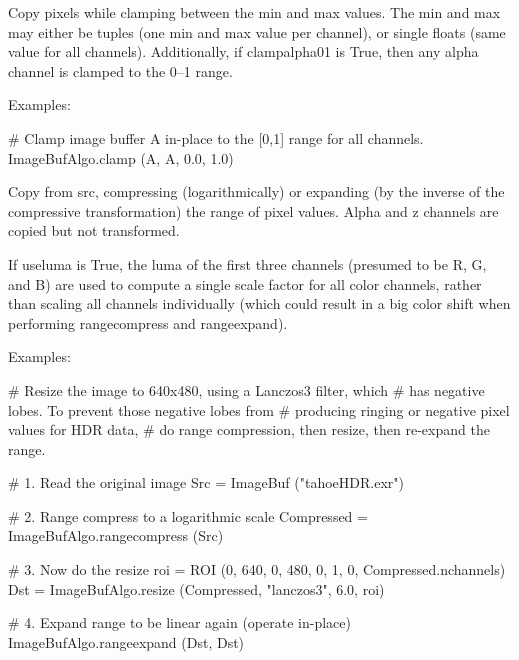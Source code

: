 Copy pixels while clamping
between the {\cf min} and {\cf max} values.  The {\cf min} and {\cf max}
may either be tuples (one min and max value per channel), or single
{\cf floats} (same value for all channels).  Additionally, if
{\cf clampalpha01} is {\cf True}, then any alpha 
channel is clamped to the 0--1 range.

\smallskip
\noindent Examples:
\begin{code}
    # Clamp image buffer A in-place to the [0,1] range for all channels.
    ImageBufAlgo.clamp (A, A, 0.0, 1.0)
\end{code}
\apiend


 
 

Copy from {\cf src}, compressing (logarithmically) or expanding
(by the inverse of the compressive transformation) the range of pixel
values.  Alpha and z channels are copied but not transformed.

If {\cf useluma} is {\cf True}, the luma of the first three channels (presumed
to be R, G, and B) are used to compute a single scale factor for all
color channels, rather than scaling all channels individually (which
could result in a big color shift when performing {\cf rangecompress}
and {\cf rangeexpand}).

\smallskip
\noindent Examples:
\begin{code}
    # Resize the image to 640x480, using a Lanczos3 filter, which
    # has negative lobes. To prevent those negative lobes from
    # producing ringing or negative pixel values for HDR data,
    # do range compression, then resize, then re-expand the range.

    # 1. Read the original image
    Src = ImageBuf ("tahoeHDR.exr")

    # 2. Range compress to a logarithmic scale
    Compressed = ImageBufAlgo.rangecompress (Src)

    # 3. Now do the resize
    roi = ROI (0, 640, 0, 480, 0, 1, 0, Compressed.nchannels)
    Dst = ImageBufAlgo.resize (Compressed, "lanczos3", 6.0, roi)

    # 4. Expand range to be linear again (operate in-place)
    ImageBufAlgo.rangeexpand (Dst, Dst)
\end{code}
\apiend



